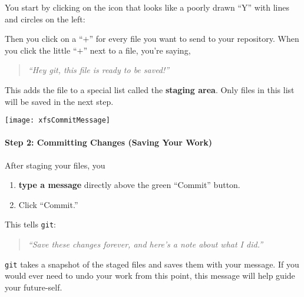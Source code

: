 \documentclass{ximera}
\begin{document}
    You start by clicking on the icon that looks like a poorly drawn ``Y'' with
    lines and circles on the left:
    \begin{image}
        \end{image}
    Then you click on a ``$\boldsymbol{+}$'' for every file you
    want
    to send to your repository.  When you click the little ``$\boldsymbol{+}$'' next
    to a
    file, you're saying,
    \begin{quote}
        \emph{``Hey git, this file is ready to be saved!''}
    \end{quote}

    This adds the file to a special list called the \textbf{staging area}. Only
    files in this list will be saved in the next step.

\pdfOnly{\end{multicols*}}

\newpage

\begin{image}
    \texttt{[image: xfsCommitMessage]}
\end{image}
    \paragraph{Step 2: Committing Changes (Saving Your Work)}

    After staging your files, you
    \begin{enumerate}
        \item \textbf{type a message} directly above the green ``Commit''
              button.
        \item Click ``Commit.''
    \end{enumerate}
    This tells \verb!git!:
    \begin{quote}
        \emph{``Save these changes forever, and here's a note about what I
            did.''}
    \end{quote}
    \verb!git! takes a snapshot of the staged files and saves them with your message.
    If you would ever need to undo your work from this point, this message will
    help guide your future-self.
\pdfOnly{\end{multicols*}}
\end{document}
